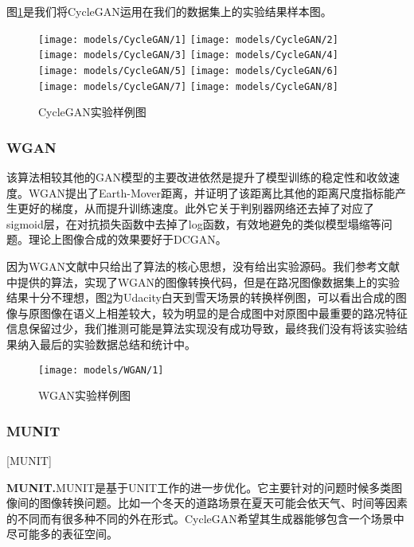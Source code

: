 图\ref{fig:cyclegan}是我们将CycleGAN运用在我们的数据集上的实验结果样本图。 

\begin{figure}[h]
    \centering
    \texttt{[image: models/CycleGAN/1]}
    \texttt{[image: models/CycleGAN/2]}
    \texttt{[image: models/CycleGAN/3]}
    \texttt{[image: models/CycleGAN/4]}
    \texttt{[image: models/CycleGAN/5]}
    \texttt{[image: models/CycleGAN/6]}\texttt{[image: models/CycleGAN/7]}
    \texttt{[image: models/CycleGAN/8]}
    \caption{CycleGAN实验样例图}
    \label{fig:cyclegan}
\end{figure} 


\subsubsection{WGAN}

 该算法相较其他的GAN模型的主要改进依然是提升了模型训练的稳定性和收敛速度。WGAN提出了Earth-Mover距离，并证明了该距离比其他的距离尺度指标能产生更好的梯度，从而提升训练速度。此外它关于判别器网络还去掉了对应了sigmoid层，在对抗损失函数中去掉了log函数，有效地避免的类似模型塌缩等问题。理论上图像合成的效果要好于DCGAN。

因为WGAN文献中只给出了算法的核心思想，没有给出实验源码。我们参考文献中提供的算法，实现了WGAN的图像转换代码，但是在路况图像数据集上的实验结果十分不理想，图\ref{fig:wgan}为Udacity白天到雪天场景的转换样例图，可以看出合成的图像与原图像在语义上相差较大，较为明显的是合成图中对原图中最重要的路况特征信息保留过少，我们推测可能是算法实现没有成功导致，最终我们没有将该实验结果纳入最后的实验数据总结和统计中。

\begin{figure}[ht]
    \centering
    \texttt{[image: models/WGAN/1]}
    \caption{WGAN实验样例图}
    \label{fig:wgan}
\end{figure}

\subsubsection{MUNIT}[MUNIT]

\textbf{MUNIT.}\cite{MUNIT}\quad MUNIT是基于UNIT\cite{UNIT}工作的进一步优化。它主要针对的问题时候多类图像间的图像转换问题。比如一个冬天的道路场景在夏天可能会依天气、时间等因素的不同而有很多种不同的外在形式。CycleGAN希望其生成器能够包含一个场景中尽可能多的表征空间。

